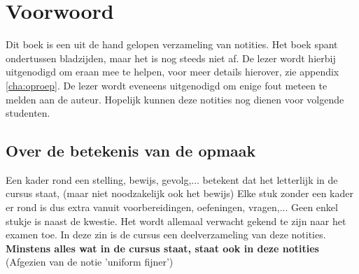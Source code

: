 \documentclass[main.tex]{subfiles}
\begin{document}
\section*{Voorwoord}
\label{sec:voorwoord}

Dit boek is een uit de hand gelopen verzameling van notities.
Het boek spant ondertussen \pageref{LastPage} bladzijden, maar het is nog steeds niet af.
De lezer wordt hierbij uitgenodigd om eraan mee te helpen, voor meer details hierover, zie appendix \ref{cha:oproep}.
De lezer wordt eveneens uitgenodigd om enige fout meteen te melden aan de auteur.
Hopelijk kunnen deze notities nog dienen voor volgende studenten.

\subsection*{Over de betekenis van de opmaak}
\label{sec:over-de-betekenis}

Een kader rond een stelling, bewijs, gevolg,... betekent dat het letterlijk in de cursus staat, (maar niet noodzakelijk ook het bewijs)
Elke stuk zonder een kader er rond is dus extra vanuit voorbereidingen, oefeningen, vragen,... 
Geen enkel stukje is naast de kwestie.
Het wordt allemaal verwacht gekend te zijn naar het examen toe.
In deze zin is de cursus een deelverzameling van deze notities.
\textbf{Minstens alles wat in de cursus staat, staat ook in deze notities}
(Afgezien van de notie 'uniform fijner')
\end{document}
